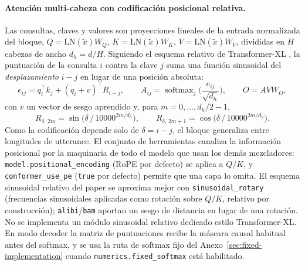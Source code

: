 \paragraph{Atención multi-cabeza con codificación posicional relativa.} Las consultas, claves y valores son proyecciones lineales de la entrada normalizada del bloque, $Q = \mathrm{LN}(\tilde{x})W_Q$, $K = \mathrm{LN}(\tilde{x})W_K$, $V = \mathrm{LN}(\tilde{x})W_V$, divididas en $H$ cabezas de ancho $d_h = d/H$. Siguiendo el esquema relativo de Transformer-XL \citep{Dai2019}, la puntuación de la consulta $i$ contra la clave $j$ suma una función sinusoidal del \emph{desplazamiento} $i-j$ en lugar de una posición absoluta:
\begin{equation}
e_{ij} = q_i^{\top} k_j + (q_i + v)^{\top} R_{i-j},
\qquad
A_{ij} = \operatorname{softmax}_j\!\Big(\frac{e_{ij}}{\sqrt{d_h}}\Big),
\qquad
O = A V W_O,
\label{eq:conformer-relpe}
\end{equation}
con $v$ un vector de sesgo aprendido y, para $m = 0, \dots, d_h/2 - 1$,
\begin{equation}
R_{\delta,\,2m} = \sin\!\big(\delta\,/\,10000^{2m/d_h}\big),
\qquad
R_{\delta,\,2m+1} = \cos\!\big(\delta\,/\,10000^{2m/d_h}\big).
\label{eq:conformer-sinusoid}
\end{equation}
Como la codificación depende solo de $\delta = i-j$, el bloque generaliza entre longitudes de utterance. El conjunto de herramientas canaliza la información posicional por la maquinaria de todo el modelo que usan los demás mezcladores: \texttt{model.positional\_encoding} (RoPE por defecto) se aplica a $Q/K$, y \texttt{conformer\_use\_pe} (\texttt{true} por defecto) permite que una capa lo omita. El esquema sinusoidal relativo del paper se aproxima mejor con \texttt{sinusoidal\_rotary} (frecuencias sinusoidales aplicadas como rotación sobre $Q/K$, relativo por construcción); \texttt{alibi}/\texttt{bam} aportan un sesgo de distancia en lugar de una rotación. No se implementa un módulo sinusoidal relativo dedicado estilo Transformer-XL. En modo decoder la matriz de puntuaciones recibe la máscara causal habitual antes del softmax, y se usa la ruta de softmax fijo del Anexo~\ref{sec:fixed-implementation} cuando \texttt{numerics.fixed\_softmax} está habilitado.

